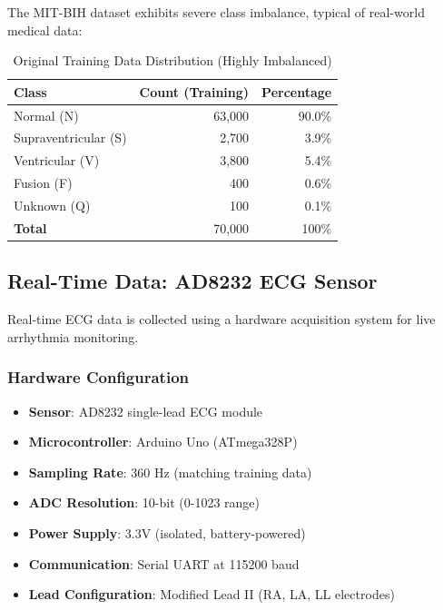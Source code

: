 \documentclass[12pt,a4paper]{article}
\begin{document}
The MIT-BIH dataset exhibits severe class imbalance, typical of real-world medical data:

\begin{table}[H]
\centering
\begin{tabular}{@{}lrr@{}}
\toprule
\textbf{Class} & \textbf{Count (Training)} & \textbf{Percentage} \\ 
\midrule
Normal (N) & ~63,000 & 90.0\% \\
Supraventricular (S) & ~2,700 & 3.9\% \\
Ventricular (V) & ~3,800 & 5.4\% \\
Fusion (F) & ~400 & 0.6\% \\
Unknown (Q) & ~100 & 0.1\% \\ 
\midrule
\textbf{Total} & ~70,000 & 100\% \\
\bottomrule
\end{tabular}
\caption{Original Training Data Distribution (Highly Imbalanced)}
\label{tab:class_distribution}
\end{table}

\subsection{Real-Time Data: AD8232 ECG Sensor}

Real-time ECG data is collected using a hardware acquisition system for live arrhythmia monitoring.

\subsubsection{Hardware Configuration}

\begin{itemize}
    \item \textbf{Sensor}: AD8232 single-lead ECG module
    \item \textbf{Microcontroller}: Arduino Uno (ATmega328P)
    \item \textbf{Sampling Rate}: 360 Hz (matching training data)
    \item \textbf{ADC Resolution}: 10-bit (0-1023 range)
    \item \textbf{Power Supply}: 3.3V (isolated, battery-powered)
    \item \textbf{Communication}: Serial UART at 115200 baud
    \item \textbf{Lead Configuration}: Modified Lead II (RA, LA, LL electrodes)
\end{itemize}
\end{document}
